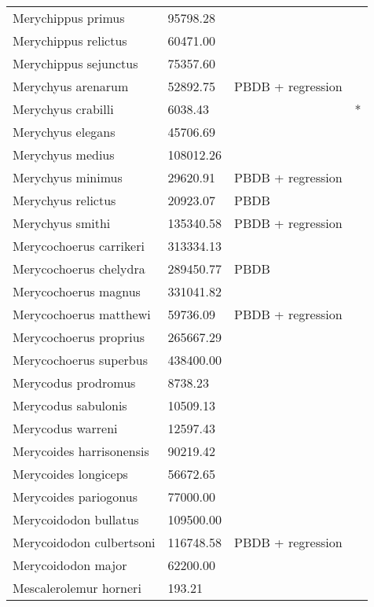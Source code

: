 \documentclass{article}
\begin{document}
\begin{center}
\begin{longtable}{p{} p{} p{} p{}}
    Merychippus primus & 95798.28 & \cite{Tomiya2013} &  \\ 
    Merychippus relictus & 60471.00 & \cite{McKenna2011} &  \\ 
    Merychippus sejunctus & 75357.60 & \cite{Tomiya2013} &  \\ 
    Merychyus arenarum & 52892.75 & PBDB + regression &  \\ 
    Merychyus crabilli & 6038.43 & \cite{Johanson1996} & * \\ 
    Merychyus elegans & 45706.69 & \cite{Tomiya2013} &  \\ 
    Merychyus medius & 108012.26 & \cite{Tomiya2013} &  \\ 
    Merychyus minimus & 29620.91 & PBDB + regression &  \\ 
    Merychyus relictus & 20923.07 & PBDB &  \\ 
    Merychyus smithi & 135340.58 & PBDB + regression &  \\ 
    Merycochoerus carrikeri & 313334.13 & \cite{Rose2011a} &  \\ 
    Merycochoerus chelydra & 289450.77 & PBDB &  \\ 
    Merycochoerus magnus & 331041.82 & \cite{Tomiya2013} &  \\ 
    Merycochoerus matthewi & 59736.09 & PBDB + regression &  \\ 
    Merycochoerus proprius & 265667.29 & \cite{Tomiya2013} &  \\ 
    Merycochoerus superbus & 438400.00 & \cite{McKenna2011} &  \\ 
    Merycodus prodromus & 8738.23 & \cite{Kelley1954} &  \\ 
    Merycodus sabulonis & 10509.13 & \cite{Tomiya2013} &  \\ 
    Merycodus warreni & 12597.43 & \cite{Baskin2004} &  \\ 
    Merycoides harrisonensis & 90219.42 & \cite{Tomiya2013} &  \\ 
    Merycoides longiceps & 56672.65 & \cite{Stock1948} &  \\ 
    Merycoides pariogonus & 77000.00 & \cite{McKenna2011} &  \\ 
    Merycoidodon bullatus & 109500.00 & \cite{McKenna2011} &  \\ 
    Merycoidodon culbertsoni & 116748.58 & PBDB + regression &  \\ 
    Merycoidodon major & 62200.00 & \cite{McKenna2011} &  \\ 
    Mescalerolemur horneri & 193.21 & \cite{MacIntyre1966} &  \\ 

\end{longtable}
\end{center}
\end{document}
